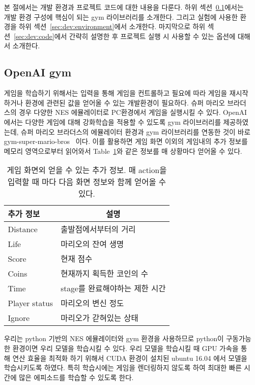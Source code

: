 
본 절에서는 개발 환경과 프로젝트 코드에 대한 내용을 다룬다.
하위 섹션~\ref{sec:dev:gym}에서는 개발 환경 구성에 핵심이 되는 gym 라이브러리를 소개한다.
그리고 실험에 사용한 환경을 하위 섹션~\ref{sec:dev:environment}에서 소개한다.
마지막으로 하위 섹션~\ref{sec:dev:code}에서 간략히 설명한 후 프로젝트 실행 시 사용할 수 있는 옵션에 대해서 소개한다.

\subsection{OpenAI gym}
\label{sec:dev:gym}
게임을 학습하기 위해서는 입력을 통해 게임을 컨트롤하고 필요에 따라 게임을 재시작하거나 환경에 관련된 값을 얻어올 수 있는 개발환경이 필요하다.
슈퍼 마리오 브라더스의 경우 다양한 NES 에뮬레이터로 PC환경에서 게임을 실행시킬 수 있다.
OpenAI에서는 다양한 게임에 대해 강화학습을 적용할 수 있도록 gym 라이브러리를 제공하였는데, 슈퍼 마리오 브라더스의 에뮬레이터 환경과 gym 라이브러리를 연동한 것이 바로 gym-super-mario-bros~\cite{GYMMario} 이다.
이를 활용하면 게임 화면 이외의 게임내의 추가 정보를 메모리 영역으로부터 읽어와서 Table~\ref{tab:mario:info}와 같은 정보를 매 상황마다 얻어올 수 있다.

\begin{table}[h]
\centering
	\caption {
		게임 화면외 얻을 수 있는 추가 정보. 매 action을 입력할 때 마다 다음 화면 정보와 함께 얻어올 수 있다.
	}
	\label{tab:mario:info}
\begin{tabular}{ll}
\toprule
추가 정보      & \multicolumn{1}{c}{설명} \\
\midrule
Distance       & 출발점에서부터의 거리 \\
Life           & 마리오의 잔여 생명 \\
Score          & 현재 점수 \\
Coins          & 현재까지 획득한 코인의 수 \\
Time           & stage를 완료해야하는 제한 시간 \\
Player status  & 마리오의 변신 정도 \\
Ignore         & 마리오가 갇혀있는 상태 \\
\bottomrule
\end{tabular}
\end{table}

우리는 python 기반의 NES 에뮬레이터와 gym 환경을 사용하므로 python이 구동가능한 환경이면 우리 모델을 학습시킬 수 있다.
우리 모델을 학습시킬 때 GPU 가속을 통해 연산 효율을 최적화 하기 위해서 CUDA 환경이 설치된 ubuntu 16.04 에서 모델을 학습시키도록 하였다.
특히 학습시에는 게임을 렌더링하지 않도록 하여 최대한 빠른 시간에 많은 에피소드를 학습할 수 있도록 한다.

